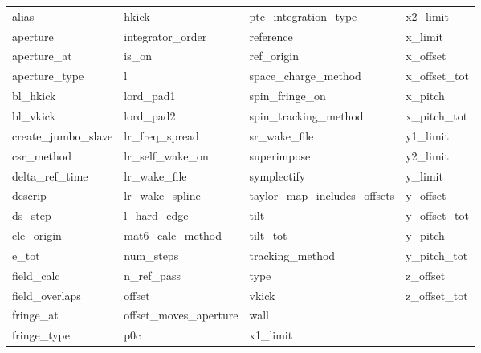  \begin{tabular}{llll} \toprule
alias                       & hkick                       & ptc_integration_type        & x2_limit                    \\
aperture                    & integrator_order            & reference                   & x_limit                     \\
aperture_at                 & is_on                       & ref_origin                  & x_offset                    \\
aperture_type               & l                           & space_charge_method         & x_offset_tot                \\
bl_hkick                    & lord_pad1                   & spin_fringe_on              & x_pitch                     \\
bl_vkick                    & lord_pad2                   & spin_tracking_method        & x_pitch_tot                 \\
create_jumbo_slave          & lr_freq_spread              & sr_wake_file                & y1_limit                    \\
csr_method                  & lr_self_wake_on             & superimpose                 & y2_limit                    \\
delta_ref_time              & lr_wake_file                & symplectify                 & y_limit                     \\
descrip                     & lr_wake_spline              & taylor_map_includes_offsets & y_offset                    \\
ds_step                     & l_hard_edge                 & tilt                        & y_offset_tot                \\
ele_origin                  & mat6_calc_method            & tilt_tot                    & y_pitch                     \\
e_tot                       & num_steps                   & tracking_method             & y_pitch_tot                 \\
field_calc                  & n_ref_pass                  & type                        & z_offset                    \\
field_overlaps              & offset                      & vkick                       & z_offset_tot                \\
fringe_at                   & offset_moves_aperture       & wall                        &                             \\
fringe_type                 & p0c                         & x1_limit                    &                             \\
 \bottomrule
 \end{tabular}
 \vfill
 
